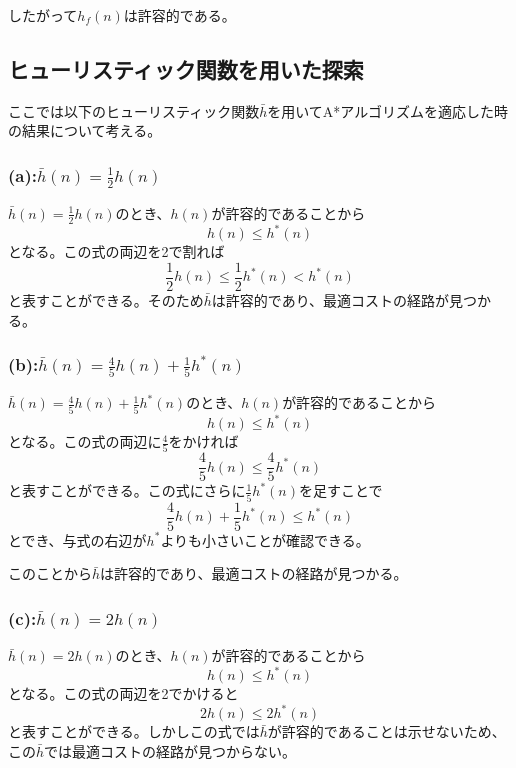 \documentclass[a4paper,11pt,dvipdfmx]{jsarticle}
\begin{document}
したがって$h_f(n)$は許容的である。

\subsection{ヒューリスティック関数を用いた探索}
ここでは以下のヒューリスティック関数$\bar{h}$を用いてA*アルゴリズムを適応した時の結果について考える。
\subsubsection{(a):$\bar{h}(n)=\frac{1}{2}h(n)$}
$\bar{h}(n)=\frac{1}{2}h(n)$のとき、$h(n)$が許容的であることから
\begin{equation*}
    h(n) \leq h^*(n)
\end{equation*}
となる。この式の両辺を2で割れば
\begin{equation*}
    \frac{1}{2} h(n) \leq \frac{1}{2} h^*(n) < h^*(n)
\end{equation*}
と表すことができる。そのため$\bar{h}$は許容的であり、最適コストの経路が見つかる。

\subsubsection{(b):$\bar{h}(n)=\frac{4}{5}h(n) + \frac{1}{5}h^*(n)$}
$\bar{h}(n)=\frac{4}{5}h(n) + \frac{1}{5}h^*(n)$のとき、$h(n)$が許容的であることから
\begin{equation*}
    h(n) \leq h^*(n)
\end{equation*}
となる。この式の両辺に$\frac{4}{5}$をかければ
\begin{equation*}
    \frac{4}{5} h(n) \leq \frac{4}{5} h^*(n) 
\end{equation*}
と表すことができる。この式にさらに$\frac{1}{5}h^*(n)$を足すことで
\begin{equation*}
    \frac{4}{5} h(n) + \frac{1}{5}h^*(n) \leq h^*(n) 
\end{equation*}
とでき、与式の右辺が$h^*$よりも小さいことが確認できる。

このことから$\bar{h}$は許容的であり、最適コストの経路が見つかる。

\subsubsection{(c):$\bar{h}(n)=2h(n)$}
$\bar{h}(n)=2h(n)$のとき、$h(n)$が許容的であることから
\begin{equation*}
    h(n) \leq h^*(n)
\end{equation*}
となる。この式の両辺を2でかけると
\begin{equation*}
    2 h(n) \leq 2 h^*(n) 
\end{equation*}
と表すことができる。しかしこの式では$\bar{h}$が許容的であることは示せないため、この$\bar{h}$では最適コストの経路が見つからない。
\end{document}
